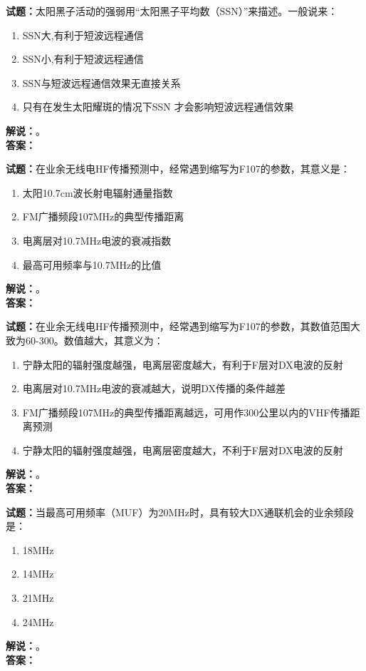 \documentclass{ctexbook}
\begin{document}
\bigskip

\noindent\textbf{试题：}太阳黑子活动的强弱用“太阳黑子平均数（SSN）”来描述。一般说来：
\begin{enumerate}[leftmargin=3em]
  \item SSN大,有利于短波远程通信
  \item SSN小,有利于短波远程通信
  \item SSN与短波远程通信效果无直接关系
  \item 只有在发生太阳耀斑的情况下SSN 才会影响短波远程通信效果
\end{enumerate}
\noindent\textbf{解说：}\textbf{}。\\\noindent\textbf{答案：}

\bigskip

\noindent\textbf{试题：}在业余无线电HF传播预测中，经常遇到缩写为F107的参数，其意义是：
\begin{enumerate}[leftmargin=3em]
  \item 太阳10.7cm波长射电辐射通量指数
  \item FM广播频段107\unit{\MHz}的典型传播距离
  \item 电离层对10.7\unit{\MHz}电波的衰减指数
  \item 最高可用频率与10.7\unit{\MHz}的比值
\end{enumerate}
\noindent\textbf{解说：}\textbf{}。\\\noindent\textbf{答案：}

\bigskip

\noindent\textbf{试题：}在业余无线电HF传播预测中，经常遇到缩写为F107的参数，其数值范围大致为60-300。数值越大，其意义为：
\begin{enumerate}[leftmargin=3em]
  \item 宁静太阳的辐射强度越强，电离层密度越大，有利于F层对DX电波的反射
  \item 电离层对10.7\unit{\MHz}电波的衰减越大，说明DX传播的条件越差
  \item FM广播频段107\unit{\MHz}的典型传播距离越远，可用作300公里以内的VHF传播距离预测
  \item 宁静太阳的辐射强度越强，电离层密度越大，不利于F层对DX电波的反射
\end{enumerate}
\noindent\textbf{解说：}\textbf{}。\\\noindent\textbf{答案：}

\bigskip

\noindent\textbf{试题：}当最高可用频率（MUF）为20\unit{\MHz}时，具有较大DX通联机会的业余频段是：
\begin{enumerate}[leftmargin=3em]
  \item 18\unit{\MHz}
  \item 14\unit{\MHz}
  \item 21\unit{\MHz}
  \item 24\unit{\MHz}
\end{enumerate}
\noindent\textbf{解说：}\textbf{}。\\\noindent\textbf{答案：}
\end{document}
